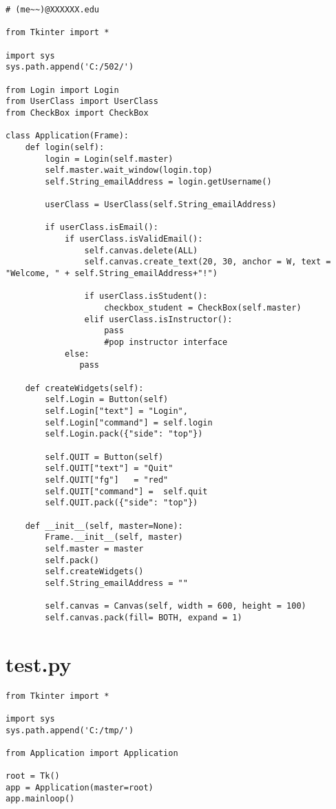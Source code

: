 \documentclass[12pt]{book}
\begin{document}
\lstset{language=java,label= ,caption= ,numbers=none}
\begin{lstlisting}
# (me~~)@XXXXXX.edu

from Tkinter import *

import sys
sys.path.append('C:/502/')

from Login import Login
from UserClass import UserClass
from CheckBox import CheckBox

class Application(Frame):
    def login(self):
        login = Login(self.master)
        self.master.wait_window(login.top)
        self.String_emailAddress = login.getUsername()

        userClass = UserClass(self.String_emailAddress)

        if userClass.isEmail():
            if userClass.isValidEmail():
                self.canvas.delete(ALL)
                self.canvas.create_text(20, 30, anchor = W, text = "Welcome, " + self.String_emailAddress+"!")

                if userClass.isStudent():
                    checkbox_student = CheckBox(self.master)
                elif userClass.isInstructor():
                    pass
                    #pop instructor interface
            else:
               pass 

    def createWidgets(self):
        self.Login = Button(self)
        self.Login["text"] = "Login",
        self.Login["command"] = self.login
        self.Login.pack({"side": "top"})

        self.QUIT = Button(self)
        self.QUIT["text"] = "Quit"
        self.QUIT["fg"]   = "red"
        self.QUIT["command"] =  self.quit
        self.QUIT.pack({"side": "top"})

    def __init__(self, master=None):
        Frame.__init__(self, master)
        self.master = master
        self.pack()
        self.createWidgets()
        self.String_emailAddress = ""

        self.canvas = Canvas(self, width = 600, height = 100)
        self.canvas.pack(fill= BOTH, expand = 1)
\end{lstlisting}

\section{test.py}
\label{sec-37-6}

\lstset{language=java,label= ,caption= ,numbers=none}
\begin{lstlisting}
from Tkinter import *

import sys
sys.path.append('C:/tmp/')

from Application import Application

root = Tk()
app = Application(master=root)
app.mainloop()
\end{lstlisting}
\end{document}
